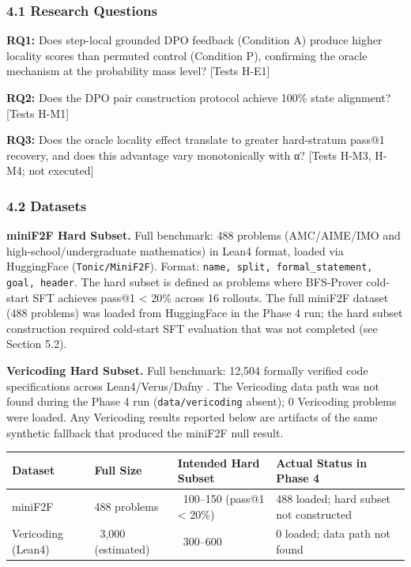 
\subsubsection{4.1 Research Questions}

\textbf{RQ1:} Does step-local grounded DPO feedback (Condition A) produce higher locality scores than permuted control (Condition P), confirming the oracle mechanism at the probability mass level? [Tests H-E1]

\textbf{RQ2:} Does the DPO pair construction protocol achieve 100\% state alignment? [Tests H-M1]

\textbf{RQ3:} Does the oracle locality effect translate to greater hard-stratum pass@1 recovery, and does this advantage vary monotonically with α? [Tests H-M3, H-M4; not executed]

\subsubsection{4.2 Datasets}

\textbf{miniF2F Hard Subset.} Full benchmark: 488 problems (AMC/AIME/IMO and high-school/undergraduate mathematics) in Lean4 format, loaded via HuggingFace (\texttt{Tonic/MiniF2F}). Format: \texttt{{name, split, formal_statement, goal, header}}. The hard subset is defined as problems where BFS-Prover cold-start SFT achieves pass@1 < 20\% across 16 rollouts. The full miniF2F dataset (488 problems) was loaded from HuggingFace in the Phase 4 run; the hard subset construction required cold-start SFT evaluation that was not completed (see Section 5.2).

\textbf{Vericoding Hard Subset.} Full benchmark: 12,504 formally verified code specifications across Lean4/Verus/Dafny \citep{Bursucetal2025}. The Vericoding data path was not found during the Phase 4 run (\texttt{data/vericoding} absent); 0 Vericoding problems were loaded. Any Vericoding results reported below are artifacts of the same synthetic fallback that produced the miniF2F null result.

\begin{table}[htbp]
\centering
\begin{tabular}{llll}
\toprule
Dataset & Full Size & Intended Hard Subset & Actual Status in Phase 4 \\
\midrule
miniF2F & 488 problems & ~100–150 (pass@1 < 20\%) & 488 loaded; hard subset not constructed \\
Vericoding (Lean4) & ~3,000 (estimated) & ~300–600 & 0 loaded; data path not found \\
\bottomrule
\end{tabular}
\end{table}

